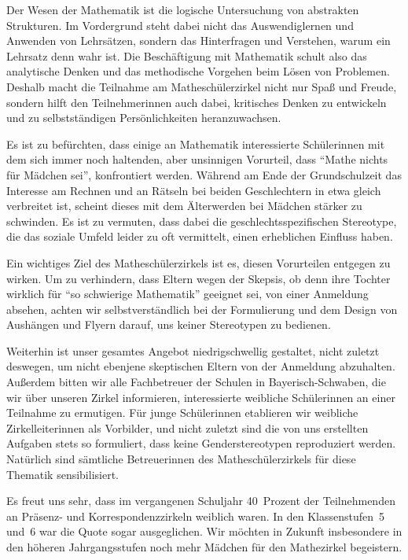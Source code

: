 \documentclass[12pt]{zettel}
\begin{document}
Der Wesen der Mathematik ist die logische Untersuchung von abstrakten Strukturen. Im Vordergrund steht dabei nicht das Auswendiglernen und Anwenden von Lehrsätzen, sondern
das Hinterfragen und Verstehen, warum ein Lehrsatz denn wahr ist. Die Beschäftigung mit Mathematik schult also das analytische Denken und das methodische Vorgehen beim Lösen
von Problemen. Deshalb macht die Teilnahme am Matheschülerzirkel nicht nur Spaß und Freude, sondern hilft den Teilnehmerinnen auch dabei, kritisches Denken
zu entwickeln und zu selbstständigen Persönlichkeiten heranzuwachsen.

Es ist zu befürchten, dass einige an Mathematik interessierte Schülerinnen mit dem sich immer noch haltenden, aber unsinnigen Vorurteil, dass "`Mathe nichts für Mädchen sei"',
konfrontiert werden. Während am Ende der Grundschulzeit das Interesse am Rechnen und an Rätseln bei beiden Geschlechtern in etwa gleich verbreitet ist, scheint dieses mit
dem Älterwerden bei Mädchen stärker zu schwinden. Es ist zu vermuten, dass dabei die geschlechtsspezifischen Stereotype, die das soziale Umfeld leider zu oft vermittelt, einen
erheblichen Einfluss haben.

Ein wichtiges Ziel des Matheschülerzirkels ist es, diesen Vorurteilen entgegen zu wirken. Um zu verhindern, dass Eltern wegen der Skepsis, ob denn ihre
Tochter wirklich für "`so schwierige Mathematik"' geeignet sei, von einer Anmeldung absehen, achten wir selbstverständlich bei der Formulierung und dem Design von Aushängen und Flyern
darauf, uns keiner Stereotypen zu bedienen.

Weiterhin ist unser gesamtes Angebot niedrigschwellig gestaltet, nicht zuletzt deswegen, um nicht ebenjene skeptischen Eltern
von der Anmeldung abzuhalten. Außerdem bitten wir alle Fachbetreuer der Schulen in Bayerisch-Schwaben, die wir über unseren Zirkel informieren, interessierte weibliche Schülerinnen an
einer Teilnahme zu ermutigen. Für junge Schülerinnen etablieren wir weibliche Zirkelleiterinnen als Vorbilder, und nicht zuletzt sind die von uns erstellten Aufgaben stets so formuliert, dass keine Genderstereotypen reproduziert werden. Natürlich sind sämtliche Betreuerinnen des
Matheschülerzirkels für diese Thematik sensibilisiert.

Es freut uns sehr, dass im vergangenen Schuljahr
40~Prozent der Teilnehmenden an Präsenz- und Korrespondenzzirkeln weiblich waren. In den Klassenstufen~5 und~6 war die Quote sogar ausgeglichen. Wir möchten in Zukunft insbesondere
in den höheren Jahrgangsstufen noch mehr Mädchen für den Mathezirkel begeistern.
\end{document}
